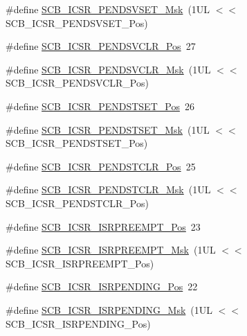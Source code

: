 \begin{DoxyCompactItemize}
\#define \mbox{\hyperlink{group___c_m_s_i_s___s_c_b_ga1e40d93efb402763c8c00ddcc56724ff}{S\+C\+B\+\_\+\+I\+C\+S\+R\+\_\+\+P\+E\+N\+D\+S\+V\+S\+E\+T\+\_\+\+Msk}}~(1\+U\+L $<$$<$ S\+C\+B\+\_\+\+I\+C\+S\+R\+\_\+\+P\+E\+N\+D\+S\+V\+S\+E\+T\+\_\+\+Pos)
\item 
\#define \mbox{\hyperlink{group___c_m_s_i_s___s_c_b_gae218d9022288f89faf57187c4d542ecd}{S\+C\+B\+\_\+\+I\+C\+S\+R\+\_\+\+P\+E\+N\+D\+S\+V\+C\+L\+R\+\_\+\+Pos}}~27
\item 
\#define \mbox{\hyperlink{group___c_m_s_i_s___s_c_b_ga4a901ace381d3c1c74ac82b22fae2e1e}{S\+C\+B\+\_\+\+I\+C\+S\+R\+\_\+\+P\+E\+N\+D\+S\+V\+C\+L\+R\+\_\+\+Msk}}~(1\+U\+L $<$$<$ S\+C\+B\+\_\+\+I\+C\+S\+R\+\_\+\+P\+E\+N\+D\+S\+V\+C\+L\+R\+\_\+\+Pos)
\item 
\#define \mbox{\hyperlink{group___c_m_s_i_s___s_c_b_ga9dbb3358c6167c9c3f85661b90fb2794}{S\+C\+B\+\_\+\+I\+C\+S\+R\+\_\+\+P\+E\+N\+D\+S\+T\+S\+E\+T\+\_\+\+Pos}}~26
\item 
\#define \mbox{\hyperlink{group___c_m_s_i_s___s_c_b_ga7325b61ea0ec323ef2d5c893b112e546}{S\+C\+B\+\_\+\+I\+C\+S\+R\+\_\+\+P\+E\+N\+D\+S\+T\+S\+E\+T\+\_\+\+Msk}}~(1\+U\+L $<$$<$ S\+C\+B\+\_\+\+I\+C\+S\+R\+\_\+\+P\+E\+N\+D\+S\+T\+S\+E\+T\+\_\+\+Pos)
\item 
\#define \mbox{\hyperlink{group___c_m_s_i_s___s_c_b_gadbe25e4b333ece1341beb1a740168fdc}{S\+C\+B\+\_\+\+I\+C\+S\+R\+\_\+\+P\+E\+N\+D\+S\+T\+C\+L\+R\+\_\+\+Pos}}~25
\item 
\#define \mbox{\hyperlink{group___c_m_s_i_s___s_c_b_gab241827d2a793269d8cd99b9b28c2157}{S\+C\+B\+\_\+\+I\+C\+S\+R\+\_\+\+P\+E\+N\+D\+S\+T\+C\+L\+R\+\_\+\+Msk}}~(1\+U\+L $<$$<$ S\+C\+B\+\_\+\+I\+C\+S\+R\+\_\+\+P\+E\+N\+D\+S\+T\+C\+L\+R\+\_\+\+Pos)
\item 
\#define \mbox{\hyperlink{group___c_m_s_i_s___s_c_b_ga11cb5b1f9ce167b81f31787a77e575df}{S\+C\+B\+\_\+\+I\+C\+S\+R\+\_\+\+I\+S\+R\+P\+R\+E\+E\+M\+P\+T\+\_\+\+Pos}}~23
\item 
\#define \mbox{\hyperlink{group___c_m_s_i_s___s_c_b_gaa966600396290808d596fe96e92ca2b5}{S\+C\+B\+\_\+\+I\+C\+S\+R\+\_\+\+I\+S\+R\+P\+R\+E\+E\+M\+P\+T\+\_\+\+Msk}}~(1\+U\+L $<$$<$ S\+C\+B\+\_\+\+I\+C\+S\+R\+\_\+\+I\+S\+R\+P\+R\+E\+E\+M\+P\+T\+\_\+\+Pos)
\item 
\#define \mbox{\hyperlink{group___c_m_s_i_s___s_c_b_ga10749d92b9b744094b845c2eb46d4319}{S\+C\+B\+\_\+\+I\+C\+S\+R\+\_\+\+I\+S\+R\+P\+E\+N\+D\+I\+N\+G\+\_\+\+Pos}}~22
\item 
\#define \mbox{\hyperlink{group___c_m_s_i_s___s_c_b_ga056d74fd538e5d36d3be1f28d399c877}{S\+C\+B\+\_\+\+I\+C\+S\+R\+\_\+\+I\+S\+R\+P\+E\+N\+D\+I\+N\+G\+\_\+\+Msk}}~(1\+U\+L $<$$<$ S\+C\+B\+\_\+\+I\+C\+S\+R\+\_\+\+I\+S\+R\+P\+E\+N\+D\+I\+N\+G\+\_\+\+Pos)

\end{DoxyCompactItemize}
